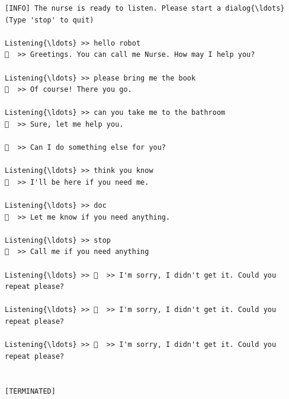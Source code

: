 \documentclass[11pt]{article}
\begin{document}
    \begin{Verbatim}[commandchars=\\\{\}]
[INFO] The nurse is ready to listen. Please start a dialog{\ldots} (Type 'stop' to quit)

Listening{\ldots} >> hello robot
👩  >> Greetings. You can call me Nurse. How may I help you?

Listening{\ldots} >> please bring me the book
👩  >> Of course! There you go.

Listening{\ldots} >> can you take me to the bathroom
👩  >> Sure, let me help you.

👩  >> Can I do something else for you?

Listening{\ldots} >> think you know
👩  >> I'll be here if you need me.

Listening{\ldots} >> doc
👩  >> Let me know if you need anything.

Listening{\ldots} >> stop
👩  >> Call me if you need anything

Listening{\ldots} >> 👩  >> I'm sorry, I didn't get it. Could you repeat please?

Listening{\ldots} >> 👩  >> I'm sorry, I didn't get it. Could you repeat please?

Listening{\ldots} >> 👩  >> I'm sorry, I didn't get it. Could you repeat please?


[TERMINATED]
    \end{Verbatim}


    
    
    
    
\end{document}
